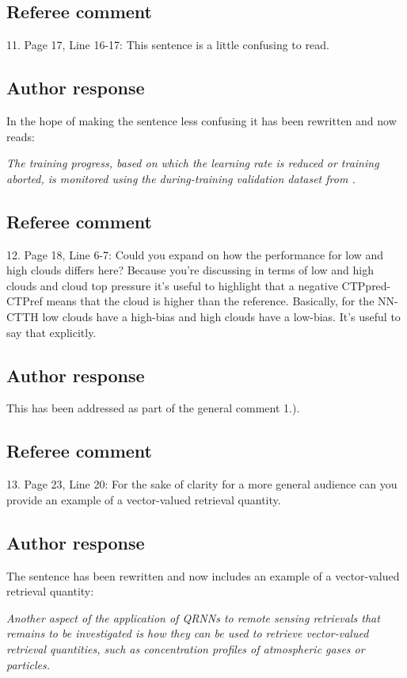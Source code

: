 \documentclass[journal abbreviation, manuscript]{copernicus}
\begin{document}
\subsection*{Referee comment}

11. Page 17, Line 16-17: This sentence is a little confusing to read.

\subsection*{Author response}

In the hope of making the sentence less confusing it has been rewritten
and now reads:

\textit{
The training progress, based on which the
learning rate is reduced or training aborted, is monitored using the
during-training validation dataset from \cite{hakansson}.
}

\subsection*{Referee comment}

12.  Page 18, Line 6-7:  Could you expand on how the performance for low and high
clouds differs here?  Because you’re discussing in terms of low and high clouds and
cloud top pressure it’s useful to highlight that a negative CTPpred-CTPref means that
the cloud is higher than the reference.  Basically, for the NN-CTTH low clouds have a
high-bias and high clouds have a low-bias. It’s useful to say that explicitly.

\subsection*{Author response}

This has been addressed as part of the general comment 1.).

\subsection*{Referee comment}

13.  Page 23, Line 20:  For the sake of clarity for a more general audience can you
provide an example of a vector-valued retrieval quantity.

\subsection*{Author response}

The sentence has been rewritten and now includes an example of a
vector-valued retrieval quantity:

\vspace{0.5em}
\textit{
Another aspect of the application of QRNNs to remote sensing retrievals that
remains to be investigated is how they can be used to retrieve vector-valued
retrieval quantities, such as concentration profiles of atmospheric gases or
particles.
}


\end{document}
